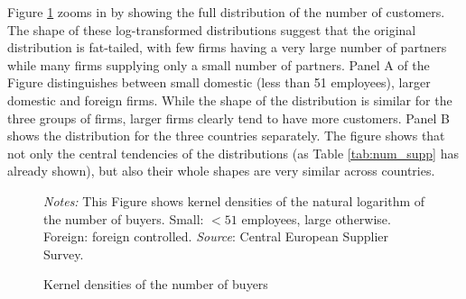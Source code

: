 \documentclass[final, dvipsnames, authoryear,12pt]{elsarticle}
\begin{document}
Figure \ref{fig:kernel} zooms in by showing the full distribution of the number of customers. The shape of these log-transformed distributions suggest that the original distribution is fat-tailed, with few firms having a very large number of partners while many firms supplying only a small number of partners. Panel A of the Figure distinguishes between small domestic (less than 51 employees), larger domestic and foreign firms. While the shape of the distribution is similar for the three groups of firms, larger firms clearly tend to have more customers. Panel B shows the distribution for the three countries separately. The figure shows that not only the central tendencies of the distributions (as Table \ref{tab:num_supp} has already shown), but also their whole shapes are very similar across countries.


\begin{figure}[h]    
    \begin{center}
    \caption{Kernel densities of the number of buyers}
    \label{fig:kernel}       
    \end{center}
    {\footnotesize \textit{Notes:} This Figure shows kernel densities of the natural logarithm of the number of buyers. Small: $< 51$ employees, large otherwise. Foreign: foreign controlled. \textit{Source}: Central European Supplier Survey.}
\end{figure}
\end{document}
